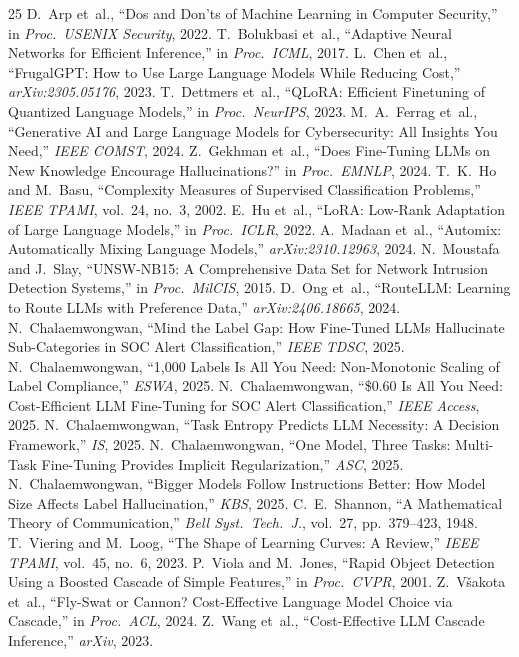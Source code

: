 \documentclass[review,3p]{elsarticle}
\begin{document}
\begin{thebibliography}{25}
 D.~Arp et~al., ``Dos and Don'ts of Machine Learning in Computer Security,'' in \emph{Proc.\ USENIX Security}, 2022.
 T.~Bolukbasi et~al., ``Adaptive Neural Networks for Efficient Inference,'' in \emph{Proc.\ ICML}, 2017.
 L.~Chen et~al., ``FrugalGPT: How to Use Large Language Models While Reducing Cost,'' \emph{arXiv:2305.05176}, 2023.
 T.~Dettmers et~al., ``QLoRA: Efficient Finetuning of Quantized Language Models,'' in \emph{Proc.\ NeurIPS}, 2023.
 M.~A.~Ferrag et~al., ``Generative AI and Large Language Models for Cybersecurity: All Insights You Need,'' \emph{IEEE COMST}, 2024.
 Z.~Gekhman et~al., ``Does Fine-Tuning LLMs on New Knowledge Encourage Hallucinations?'' in \emph{Proc.\ EMNLP}, 2024.
 T.~K.~Ho and M.~Basu, ``Complexity Measures of Supervised Classification Problems,'' \emph{IEEE TPAMI}, vol.~24, no.~3, 2002.
 E.~Hu et~al., ``LoRA: Low-Rank Adaptation of Large Language Models,'' in \emph{Proc.\ ICLR}, 2022.
 A.~Madaan et~al., ``Automix: Automatically Mixing Language Models,'' \emph{arXiv:2310.12963}, 2024.
 N.~Moustafa and J.~Slay, ``UNSW-NB15: A Comprehensive Data Set for Network Intrusion Detection Systems,'' in \emph{Proc.\ MilCIS}, 2015.
 D.~Ong et~al., ``RouteLLM: Learning to Route LLMs with Preference Data,'' \emph{arXiv:2406.18665}, 2024.
 N.~Chalaemwongwan, ``Mind the Label Gap: How Fine-Tuned LLMs Hallucinate Sub-Categories in SOC Alert Classification,'' \emph{IEEE TDSC}, 2025.
 N.~Chalaemwongwan, ``1,000 Labels Is All You Need: Non-Monotonic Scaling of Label Compliance,'' \emph{ESWA}, 2025.
 N.~Chalaemwongwan, ``\$0.60 Is All You Need: Cost-Efficient LLM Fine-Tuning for SOC Alert Classification,'' \emph{IEEE Access}, 2025.
 N.~Chalaemwongwan, ``Task Entropy Predicts LLM Necessity: A Decision Framework,'' \emph{IS}, 2025.
 N.~Chalaemwongwan, ``One Model, Three Tasks: Multi-Task Fine-Tuning Provides Implicit Regularization,'' \emph{ASC}, 2025.
 N.~Chalaemwongwan, ``Bigger Models Follow Instructions Better: How Model Size Affects Label Hallucination,'' \emph{KBS}, 2025.
 C.~E.~Shannon, ``A Mathematical Theory of Communication,'' \emph{Bell Syst.\ Tech.\ J.}, vol.~27, pp.~379--423, 1948.
 T.~Viering and M.~Loog, ``The Shape of Learning Curves: A Review,'' \emph{IEEE TPAMI}, vol.~45, no.~6, 2023.
 P.~Viola and M.~Jones, ``Rapid Object Detection Using a Boosted Cascade of Simple Features,'' in \emph{Proc.\ CVPR}, 2001.
 Z.~V\v{s}akota et~al., ``Fly-Swat or Cannon? Cost-Effective Language Model Choice via Cascade,'' in \emph{Proc.\ ACL}, 2024.
 Z.~Wang et~al., ``Cost-Effective LLM Cascade Inference,'' \emph{arXiv}, 2023.
\end{thebibliography}
\end{document}

